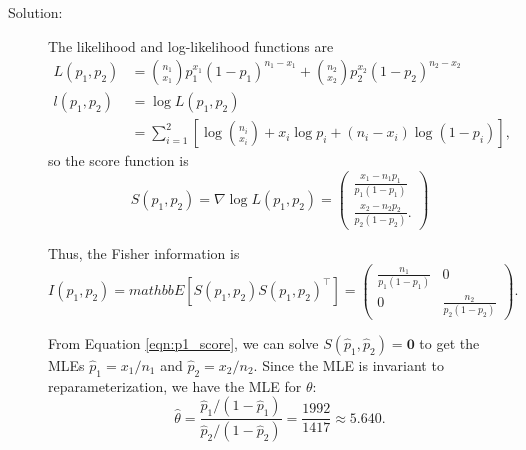 \documentclass[letterpaper,11pt]{article}
\begin{document}
\begin{enumerate}
\begin{enumerate}
    \begin{description}
    \item[Solution:]
      The likelihood and log-likelihood functions are
      \begin{align}
        L\left(p_1,p_2\right)
        &= {n_1 \choose x_1}p_1^{x_1}\left(1 - p_1\right)^{n_1 - x_1} +
          {n_2 \choose x_2}p_2^{x_2}\left(1 - p_2\right)^{n_2 - x_2} \\
        l\left(p_1,p_2\right)
        &= \log L\left(p_1,p_2\right) \nonumber\\
        &= \sum_{i=1}^2\left[
          \log {n_i \choose x_i} + x_i \log p_i + \left(n_i - x_i\right)\log\left(1 - p_i\right)
          \right],
        \nonumber
      \end{align}
      so the score function is
      \begin{equation}
        S\left(p_1,p_2\right)
        = \nabla \log L\left(p_1,p_2\right)
        = \begin{pmatrix}
          \frac{x_1 - n_1p_1}{p_1\left(1 - p_1\right)} \\
          \frac{x_2 - n_2p_2}{p_2\left(1 - p_2\right)}.
        \end{pmatrix}
        \label{eqn:p1_score}
      \end{equation}
      
      Thus, the Fisher information is
      \begin{equation}
        I\left(p_1,p_2\right) = mathbb{E}\left[
          S\left(p_1,p_2\right)S\left(p_1,p_2\right)^\intercal
        \right]= \begin{pmatrix}
          \frac{n_1}{p_1\left(1 - p_1\right)} & 0 \\
          0 & \frac{n_2}{p_2\left(1 - p_2\right)}
        \end{pmatrix}.
        \label{eqn:p1_fisher_information}
      \end{equation}

      From Equation \ref{eqn:p1_score}, we can solve
      $S\left(\hat{p}_1,\hat{p}_2\right) = \mathbf{0}$ to get the MLEs
      $\hat{p}_1 = x_1/n_1$ and $\hat{p}_2 = x_2/n_2$. Since the MLE is
      invariant to reparameterization, we have the MLE for $\theta$:
      \begin{equation}
        \boxed{\hat{\theta} = \frac{\hat{p}_1/\left(1 - \hat{p}_1\right)}{\hat{p}_2/\left(1 - \hat{p}_2\right)} = \frac{1992}{1417} \approx 5.640.}
      \end{equation}


\end{description}
\end{enumerate}
\end{enumerate}
\end{document}
